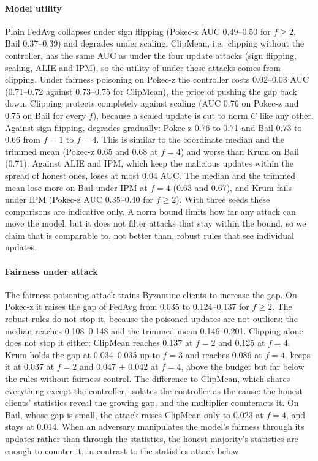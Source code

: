 \paragraph{Model utility}
Plain FedAvg collapses under sign flipping (Pokec-z AUC 0.49--0.50 for $f\ge2$, Bail 0.37--0.39) and degrades under scaling. ClipMean, i.e.\ clipping without the controller, has the same AUC as \clamp{} under the four update attacks (sign flipping, scaling, ALIE and IPM), so the utility of \clamp{} under these attacks comes from clipping. Under fairness poisoning on Pokec-z the controller costs 0.02--0.03 AUC (0.71--0.72 against 0.73--0.75 for ClipMean), the price of pushing the gap back down. Clipping protects completely against scaling (AUC 0.76 on Pokec-z and 0.75 on Bail for every $f$), because a scaled update is cut to norm $C$ like any other. Against sign flipping, \clamp{} degrades gradually: Pokec-z 0.76 to 0.71 and Bail 0.73 to 0.66 from $f=1$ to $f=4$. This is similar to the coordinate median and the trimmed mean (Pokec-z 0.65 and 0.68 at $f=4$) and worse than Krum on Bail (0.71). Against ALIE and IPM, which keep the malicious updates within the spread of honest ones, \clamp{} loses at most 0.04 AUC. The median and the trimmed mean lose more on Bail under IPM at $f=4$ (0.63 and 0.67), and Krum fails under IPM (Pokec-z AUC 0.35--0.40 for $f\ge2$). With three seeds these comparisons are indicative only. A norm bound limits how far any attack can move the model, but it does not filter attacks that stay within the bound, so we claim that \clamp{} is comparable to, not better than, robust rules that see individual updates.

\paragraph{Fairness under attack}
The fairness-poisoning attack trains Byzantine clients to increase the gap. On Pokec-z it raises the gap of FedAvg from 0.035 to 0.124--0.137 for $f\ge2$. The robust rules do not stop it, because the poisoned updates are not outliers: the median reaches 0.108--0.148 and the trimmed mean 0.146--0.201. Clipping alone does not stop it either: ClipMean reaches 0.137 at $f=2$ and 0.125 at $f=4$. Krum holds the gap at 0.034--0.035 up to $f=3$ and reaches 0.086 at $f=4$. \clamp{} keeps it at 0.037 at $f=2$ and 0.047 $\pm$ 0.042 at $f=4$, above the budget but far below the rules without fairness control. The difference to ClipMean, which shares everything except the controller, isolates the controller as the cause: the honest clients' statistics reveal the growing gap, and the multiplier counteracts it. On Bail, whose gap is small, the attack raises ClipMean only to 0.023 at $f=4$, and \clamp{} stays at 0.014. When an adversary manipulates the model's fairness through its updates rather than through the statistics, the honest majority's statistics are enough to counter it, in contrast to the statistics attack below.

